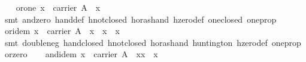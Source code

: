 \begin{isabellebody}
\endisatagproof
{\isafoldproof}%
%
\isadelimproof
\isanewline
%
\endisadelimproof
\isanewline
\ \ \isamarkupfalse%
\ or{}one{}\ {}x\ {}\ carrier\ A\ {}\ x\ {}\ {}\ {}\ {}{}\isanewline
%
\isadelimproof
\ \ \ \ %
\endisadelimproof
%
\isatagproof
{}\isamarkupfalse%
\ {}smt\ and{}zero\ hand{}def\ hnot{}closed\ hor{}as{}hand\ hzero{}def\ one{}closed\ one{}prop{}%
\endisatagproof
{\isafoldproof}%
%
\isadelimproof
\isanewline
%
\endisadelimproof
\isanewline
\ \ \isamarkupfalse%
\ or{}idem{}\ {}x\ {}\ carrier\ A\ {}\ x\ {}\ x\ {}\ x{}\isanewline
%
\isadelimproof
\ \ \ \ %
\endisadelimproof
%
\isatagproof
{}\isamarkupfalse%
\ {}smt\ double{}neg\ hand{}closed\ hnot{}closed\ hor{}as{}hand\ huntington\ hzero{}def\ one{}prop\ or{}zero{}%
\endisatagproof
{\isafoldproof}%
%
\isadelimproof
\isanewline
%
\endisadelimproof
\isanewline
\ \ \isamarkupfalse%
\ and{}idem{}\ {}x\ {}\ carrier\ A\ {}\ x{}x\ {}\ x{}\isanewline

\end{isabellebody}
